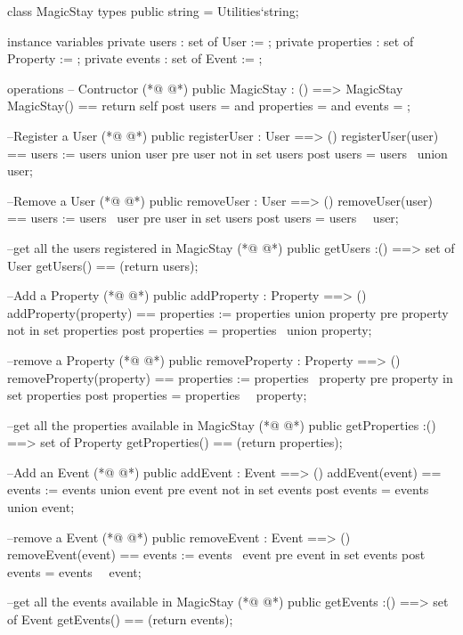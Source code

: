 \begin{vdmpp}[breaklines=true]
class MagicStay
types
 public string = Utilities`string;

instance variables
 private users : set of User := {};
 private properties : set of Property := {};
 private events : set of Event := {};

operations
 -- Contructor
(*@
\label{MagicStay:12}
@*)
 public MagicStay : () ==> MagicStay
  MagicStay() == return self
  post users = {} and properties = {} and events = {};
 
 --Register a User
(*@
\label{registerUser:17}
@*)
 public registerUser : User ==> ()
  registerUser(user) == users := users union {user}
  pre user not in set users
  post users = users~ union {user};
  
 --Remove a User
(*@
\label{removeUser:23}
@*)
 public removeUser : User ==> ()
  removeUser(user) == users := users \ {user}
  pre user in set users
  post users = users~ \ {user};
  
 --get all the users registered in MagicStay
(*@
\label{getUsers:29}
@*)
 public getUsers :() ==> set of User  
  getUsers() == (return users);
  
 --Add a Property
(*@
\label{addProperty:33}
@*)
 public addProperty : Property ==> ()
  addProperty(property) == properties := properties union {property}
  pre property not in set properties
  post properties = properties~ union {property};
  
 --remove a Property
(*@
\label{removeProperty:39}
@*)
 public removeProperty : Property ==> ()
  removeProperty(property) == properties := properties \ {property}
  pre property in set properties
  post properties = properties~ \ {property};
  
 --get all the properties available in MagicStay
(*@
\label{getProperties:45}
@*)
 public getProperties :() ==> set of Property  
  getProperties() == (return properties);

 --Add an Event
(*@
\label{addEvent:49}
@*)
 public addEvent : Event ==> ()
  addEvent(event) == events := events union {event}
  pre event not in set events
  post events = events~ union {event};

 --remove a Event
(*@
\label{removeEvent:55}
@*)
 public removeEvent : Event ==> ()
  removeEvent(event) == events := events \ {event}
  pre event in set events
  post events = events~ \ {event};
  
 --get all the events available in MagicStay
(*@
\label{getEvents:61}
@*)
 public getEvents :() ==> set of Event  
  getEvents() == (return events);
 

\end{vdmpp}
